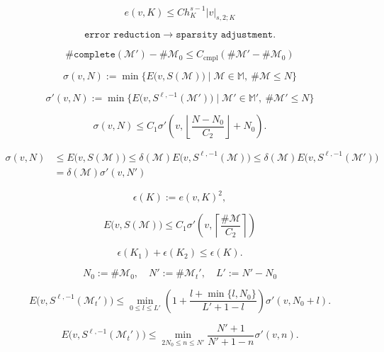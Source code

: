 \documentclass[a4paper]{article}
\begin{document}
\begin{equation}\label{BrambleHilbert}
 e(v,{K})
 \leq
 C h_{K}^{s-1} {{\left|{{v}}\right|_{{{s},{2};{K}}}}}
\end{equation}

\[
  \texttt{error reduction} \to \texttt{sparsity adjustment}.
 \]

\begin{equation}\label{complete}
 \#\texttt{complete}({\mathcal{M}}') - \#{\mathcal{M}}_0
 \leq
 {{C_\text{cmpl}}} (\#{\mathcal{M}}' - \#{\mathcal{M}}_0)
\end{equation}

\begin{equation*}
 \sigma(v,N)
 {:=}
 \min \big\{ E \big( v,{S}({\mathcal{M}}) \big)
  \mid {\mathcal{M}}\in{\mathbb{M}},\ \#{\mathcal{M}}\leq 
N \big\}
\end{equation*}

\begin{equation}
\label{nlberr}
 \sigma'(v,N)
 {:=}
 \min \{ E\big( v,{S}^{{\ell},-1}({\mathcal{M}}') \big)
   \mid {\mathcal{M}}'\in{\mathbb{M}}',\ \#{\mathcal{M}}'\leq N \}
\end{equation}

\[
 \sigma(v,N)
 \leq
 C_1 \sigma'\left(
  v, \left\lfloor \frac{N-N_0}{C_2} \right\rfloor + N_0
  \right).
\]

\begin{align*}
 \sigma(v,N)
 &\leq
 E\big( v, {S}({\mathcal{M}}) \big)
 \leq
 {\delta}({\mathcal{M}}) E\big( v, {S}^{{\ell},-1}({\mathcal{M}}) \big)
 \leq
 {\delta}({\mathcal{M}}) E\big( v, {S}^{{\ell},-1}({\mathcal{M}}') \big)
\\
 &=
 {\delta}({\mathcal{M}}) \sigma'(v,N')
\end{align*}

\[
 {\epsilon}({K}){:=} e(v,{K})^2,
\]

\[
 E\big( v,{S}({\mathcal{M}}) \big)
 \leq
 C_1 \sigma' \left( v, \left\lceil \frac{\#{\mathcal{M}}}{C_2} \right\rceil \right)
\]

\[
 {\epsilon}({K}_1) + {\epsilon}({K}_2) \leq {\epsilon}({K}).
\]

\[
 N_0{:=}\#{\mathcal{M}}_0,
\quad
 N'{:=}\#{\mathcal{M}}_t',
\quad
 L'{:=} N'-N_0
\]

\[
 E\big( v,{S}^{{\ell},-1}({\mathcal{M}}_t') \big)
 \leq
 \min_{0 \leq l \leq L'} \left( 1 +
   \frac{l + \min\{l,N_0\}}{L' + 1 - l}
   \right) \sigma'(v,N_0+l).
\]

\[
 E\big( v,{S}^{{\ell},-1}({\mathcal{M}}_t') \big)
 \leq
 \min_{2N_0 \leq n \leq N'} \frac{N'+1}{N'+1-n} \sigma'(v,n).
\]
\end{document}
